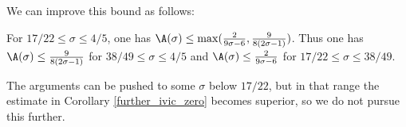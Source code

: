 We can improve this bound as follows:

\begin{theorem}\label{bourgain-density-improved} For $17/22 \leq \sigma \leq 4/5$, one has $\A(\sigma) \leq \max( \frac{2}{9\sigma-6}, \frac{9}{8(2\sigma-1)} )$.  Thus one has $\A(\sigma) \leq \frac{9}{8(2\sigma-1)}$ for $38/49 \leq \sigma \leq 4/5$ and $\A(\sigma) \leq \frac{2}{9\sigma-6}$ for $17/22 \leq \sigma \leq 38/49$.
\end{theorem}
\derived
{}

The arguments can be pushed to some $\sigma$ below $17/22$, but in that range the estimate in Corollary \ref{further_ivic_zero} becomes superior, so we do not pursue this further.

